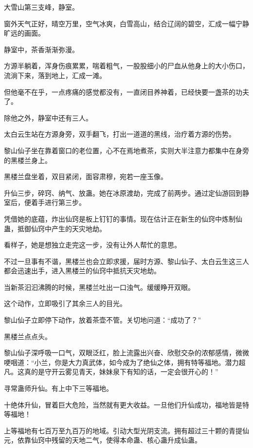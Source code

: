 
\begin{this_body}



大雪山第三支峰，静室。

窗外天气正好，晴空万里，空气冰爽，白雪高山，结合辽阔的碧空，汇成一幅宁静旷远的画面。

静室中，茶香渐渐弥漫。

方源半躺着，浑身伤痕累累，喘着粗气，一股股细小的尸血从他身上的大小伤口，流淌下来，落到地上，汇成一滩。

但他毫不在乎，一点疼痛的感觉都没有，一直闭目养神着，已经快要一盏茶的功夫了。

除他之外，静室中还有三人。

太白云生站在方源身旁，双手翻飞，打出一道道的黑线，治疗着方源的伤势。

黎山仙子坐在靠着窗口的老位置，心不在焉地煮茶，实则大半注意力都集中在身旁的黑楼兰身上。

黑楼兰盘坐着，双目紧闭，面容肃穆，宛若一座玉像。

升仙三步，碎窍、纳气、放蛊。她在冰原渡劫，完成了前两步。通过定仙游回到静室后，便着手进行第三步。

凭借她的底蕴，炸出仙窍是板上钉钉的事情。现在估计正在新生的仙窍中炼制仙蛊，抵御仙窍中产生的天灾地劫。

看样子，她是想独立走完这一步，没有让外人帮忙的意思。

不过一旦事有不谐，黑楼兰也会立即求援，届时方源、黎山仙子、太白云生这三人都会迅速出手，进入黑楼兰的仙窍中抵抗天灾地劫。

当新茶汩汩沸腾的时候，黑楼兰吐出一口浊气。缓缓睁开双眼。

这个动作，立即吸引了其余三人的目光。

黎山仙子立即停下动作，放着茶壶不管。关切地问道：“成功了？”

黑楼兰点点头。

黎山仙子深呼吸一口气，双眼泛红，脸上流露出兴奋、欣慰交杂的浓郁感情，微微哽咽道：“小兰，你是大力真武体，如今成为了绝仙之体，拥有特等福地。潜力超凡。这真的是守开云雾见青天，妹妹泉下有知的话，一定会很开心的！”

寻常蛊师升仙。有上中下三等福地。

十绝体升仙，冒着巨大危险，当然就有更大收益。一旦他们升仙成功，福地皆是特等福地！

上等福地有七百万至九百万的地域。引动大型光阴支流。拥有超过三十颗的青提仙元，依靠仙窍中残留的天地二气，使得本命蛊、核心蛊升成仙蛊。


\end{this_body}
